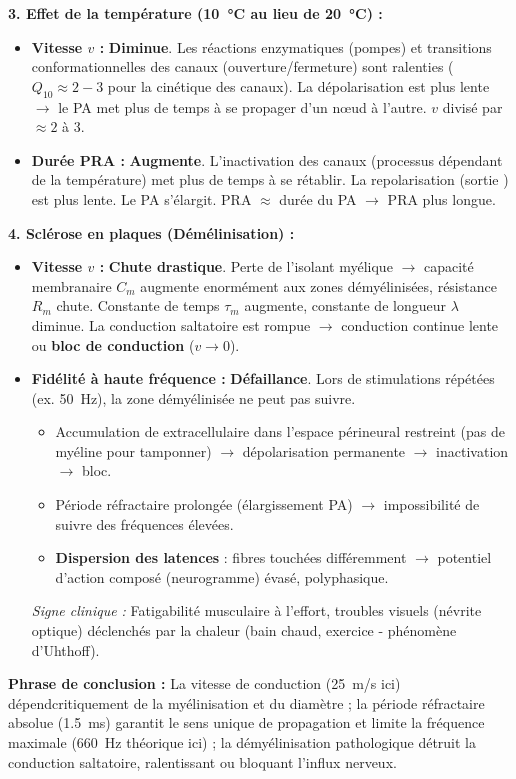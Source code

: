 \documentclass[11pt]{article}
\begin{document}
\begin{exoresolu}
\textbf{3. Effet de la température (\SI{10}{\celsius} au lieu de \SI{20}{\celsius}) :}
\begin{itemize}
    \item \textbf{Vitesse $v$ :} \textbf{Diminue}. Les réactions enzymatiques (pompes) et transitions conformationnelles des canaux (ouverture/fermeture) sont ralenties ($Q_{10} \approx 2-3$ pour la cinétique des canaux). La dépolarisation est plus lente $\rightarrow$ le PA met plus de temps à se propager d'un nœud à l'autre. $v$ divisé par $\approx 2$ à \num{3}.
    \item \textbf{Durée PRA :} \textbf{Augmente}. L'inactivation des canaux  (processus dépendant de la température) met plus de temps à se rétablir. La repolarisation (sortie ) est plus lente. Le PA s'élargit. PRA $\approx$ durée du PA $\rightarrow$ PRA plus longue.
\end{itemize}

\textbf{4. Sclérose en plaques (Démélinisation) :}
\begin{itemize}
    \item \textbf{Vitesse $v$ :} \textbf{Chute drastique}. Perte de l'isolant myélique $\rightarrow$ capacité membranaire $C_m$ augmente enormément aux zones démyélinisées, résistance $R_m$ chute. Constante de temps $\tau_m$ augmente, constante de longueur $\lambda$ diminue. La conduction saltatoire est rompue $\rightarrow$ conduction continue lente ou \textbf{bloc de conduction} ($v \to 0$).
    \item \textbf{Fidélité à haute fréquence :} \textbf{Défaillance}. Lors de stimulations répétées (ex. \SI{50}{Hz}), la zone démyélinisée ne peut pas suivre.
    \begin{itemize}
        \item Accumulation de  extracellulaire dans l'espace périneural restreint (pas de myéline pour tamponner) $\rightarrow$ dépolarisation permanente $\rightarrow$ inactivation  $\rightarrow$ bloc.
        \item Période réfractaire prolongée (élargissement PA) $\rightarrow$ impossibilité de suivre des fréquences élevées.
        \item \textbf{Dispersion des latences} : fibres touchées différemment $\rightarrow$ potentiel d'action composé (neurogramme) évasé, polyphasique.
    \end{itemize}
    \textit{Signe clinique :} Fatigabilité musculaire à l'effort, troubles visuels (névrite optique) déclenchés par la chaleur (bain chaud, exercice - phénomène d'Uhthoff).
\end{itemize}

\textbf{Phrase de conclusion :} La vitesse de conduction (\SI{25}{m/s} ici) dépendcritiquement de la myélinisation et du diamètre ; la période réfractaire absolue (\SI{1,5}{ms}) garantit le sens unique de propagation et limite la fréquence maximale (\SI{660}{Hz} théorique ici) ; la démyélinisation pathologique détruit la conduction saltatoire, ralentissant ou bloquant l'influx nerveux.
\end{exoresolu}
\end{document}
